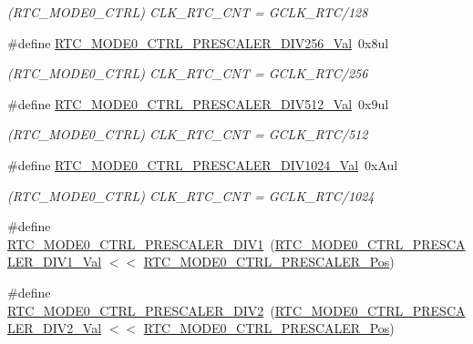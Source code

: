 \begin{DoxyCompactItemize}
\begin{DoxyCompactList}\small\item\em (R\+T\+C\+\_\+\+M\+O\+D\+E0\+\_\+\+C\+T\+RL) C\+L\+K\+\_\+\+R\+T\+C\+\_\+\+C\+NT = G\+C\+L\+K\+\_\+\+R\+T\+C/128 \end{DoxyCompactList}\item 
\#define \mbox{\hyperlink{group___s_a_m_d21___r_t_c_ga145091d83dcbc43f7ca1c6d84a598865}{R\+T\+C\+\_\+\+M\+O\+D\+E0\+\_\+\+C\+T\+R\+L\+\_\+\+P\+R\+E\+S\+C\+A\+L\+E\+R\+\_\+\+D\+I\+V256\+\_\+\+Val}}~0x8ul
\begin{DoxyCompactList}\small\item\em (R\+T\+C\+\_\+\+M\+O\+D\+E0\+\_\+\+C\+T\+RL) C\+L\+K\+\_\+\+R\+T\+C\+\_\+\+C\+NT = G\+C\+L\+K\+\_\+\+R\+T\+C/256 \end{DoxyCompactList}\item 
\#define \mbox{\hyperlink{group___s_a_m_d21___r_t_c_ga7bb0d53dbe87b701a52631ce6f3d302d}{R\+T\+C\+\_\+\+M\+O\+D\+E0\+\_\+\+C\+T\+R\+L\+\_\+\+P\+R\+E\+S\+C\+A\+L\+E\+R\+\_\+\+D\+I\+V512\+\_\+\+Val}}~0x9ul
\begin{DoxyCompactList}\small\item\em (R\+T\+C\+\_\+\+M\+O\+D\+E0\+\_\+\+C\+T\+RL) C\+L\+K\+\_\+\+R\+T\+C\+\_\+\+C\+NT = G\+C\+L\+K\+\_\+\+R\+T\+C/512 \end{DoxyCompactList}\item 
\#define \mbox{\hyperlink{group___s_a_m_d21___r_t_c_ga50662d4b719aae47265b92a794c586ab}{R\+T\+C\+\_\+\+M\+O\+D\+E0\+\_\+\+C\+T\+R\+L\+\_\+\+P\+R\+E\+S\+C\+A\+L\+E\+R\+\_\+\+D\+I\+V1024\+\_\+\+Val}}~0x\+Aul
\begin{DoxyCompactList}\small\item\em (R\+T\+C\+\_\+\+M\+O\+D\+E0\+\_\+\+C\+T\+RL) C\+L\+K\+\_\+\+R\+T\+C\+\_\+\+C\+NT = G\+C\+L\+K\+\_\+\+R\+T\+C/1024 \end{DoxyCompactList}\item 
\#define \mbox{\hyperlink{group___s_a_m_d21___r_t_c_ga027b0b7d026a8884c19e6e89aba663f1}{R\+T\+C\+\_\+\+M\+O\+D\+E0\+\_\+\+C\+T\+R\+L\+\_\+\+P\+R\+E\+S\+C\+A\+L\+E\+R\+\_\+\+D\+I\+V1}}~(\mbox{\hyperlink{group___s_a_m_d21___r_t_c_gab83b5689ebf22a3732d6b26604849711}{R\+T\+C\+\_\+\+M\+O\+D\+E0\+\_\+\+C\+T\+R\+L\+\_\+\+P\+R\+E\+S\+C\+A\+L\+E\+R\+\_\+\+D\+I\+V1\+\_\+\+Val}} $<$$<$ \mbox{\hyperlink{group___s_a_m_d21___r_t_c_gae6a98daefadfa386b8f37022a707044e}{R\+T\+C\+\_\+\+M\+O\+D\+E0\+\_\+\+C\+T\+R\+L\+\_\+\+P\+R\+E\+S\+C\+A\+L\+E\+R\+\_\+\+Pos}})
\item 
\#define \mbox{\hyperlink{group___s_a_m_d21___r_t_c_ga236d3833497e2c5e20f743b4675ae50e}{R\+T\+C\+\_\+\+M\+O\+D\+E0\+\_\+\+C\+T\+R\+L\+\_\+\+P\+R\+E\+S\+C\+A\+L\+E\+R\+\_\+\+D\+I\+V2}}~(\mbox{\hyperlink{group___s_a_m_d21___r_t_c_ga3876073889ac5e0eb43ce6327917af05}{R\+T\+C\+\_\+\+M\+O\+D\+E0\+\_\+\+C\+T\+R\+L\+\_\+\+P\+R\+E\+S\+C\+A\+L\+E\+R\+\_\+\+D\+I\+V2\+\_\+\+Val}} $<$$<$ \mbox{\hyperlink{group___s_a_m_d21___r_t_c_gae6a98daefadfa386b8f37022a707044e}{R\+T\+C\+\_\+\+M\+O\+D\+E0\+\_\+\+C\+T\+R\+L\+\_\+\+P\+R\+E\+S\+C\+A\+L\+E\+R\+\_\+\+Pos}})

\end{DoxyCompactItemize}
